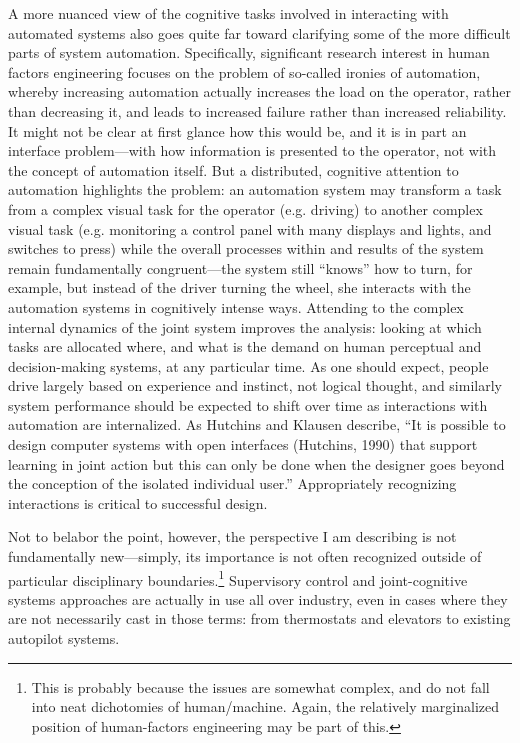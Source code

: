 A more nuanced view of the cognitive tasks involved in interacting
with automated systems also goes quite far toward clarifying some
of the more difficult parts of system automation. Specifically,
significant research interest in human factors engineering focuses on
the problem of so-called ironies of automation, whereby increasing automation actually
increases the load on the operator, rather than decreasing it, and
leads to increased failure rather than increased
reliability.\cite{???-somethingin-hutchins} It might
not be clear at first glance how this would be, and it is in part an
interface problem---with how information is presented to the operator,
not with the concept of automation itself. But a distributed,
cognitive attention to automation highlights the problem:  an
automation system may transform a task from a complex visual task for the
operator (e.g. driving) to another complex visual task (e.g. monitoring a control
panel with many displays and lights, and switches to press) while the
overall processes within and results of the system remain
fundamentally congruent---the system still ``knows'' how to turn, for
example, but instead of the driver turning the wheel, she interacts
with the automation systems in cognitively intense ways. Attending to
the complex internal dynamics of
the joint system improves the analysis: looking at which tasks are
allocated where, and what is the demand on human perceptual and
decision-making systems, at any particular time. As one should expect,
people drive largely based on experience and instinct,\cite{article-http://www.telegraph.co.uk/news/science/science-news/11410261/Driverless-car-beats-racing-driver-for-first-time.html} not logical
thought, and similarly system performance should be expected to shift
over time as interactions with automation are internalized. As
Hutchins and Klausen describe, ``It is possible to design computer systems with open
interfaces (Hutchins, 1990) that support learning in joint action but
this can only be done when the designer goes beyond the conception of
the isolated individual user.''\cite[p. 13]{hutchinsKlausen}
Appropriately recognizing interactions is critical to successful design.

Not to belabor the point, however, the perspective I am describing is
not fundamentally new---simply, its importance is not often
recognized outside of particular disciplinary
boundaries.\footnote{This is probably because the issues are
  somewhat complex, and do not fall into neat dichotomies of
  human/machine. Again, the relatively marginalized position of
  human-factors engineering may be part of this.} Supervisory control and 
joint-cognitive systems approaches are actually in use all over
industry, even in cases where they are not necessarily cast in
those terms: from thermostats and elevators to existing autopilot systems.

